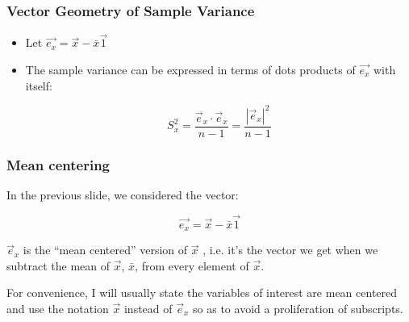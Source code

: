 \documentclass{beamer}
\begin{document}
\begin{frame}[shrink]
  \frametitle{Vector Geometry of Sample Variance}

\begin{itemize}

\item Let $\vec{e_x} = \vec{x} - \bar{x}\vec{1}$

\item The sample variance can be expressed in terms of dots products of $\vec{e_x}$ with itself:

\begin{equation*}
    S_{x}^2 = \frac{\vec{e}_x \cdot \vec{e}_x}{n-1} = \frac{|\vec{e}_x|^2}{n-1}
\end{equation*}


\end{itemize}

\medskip

\begin{center}
\end{center}

\end{frame}

\begin{frame}
  \frametitle{Mean centering}

In the previous slide, we considered the vector: 

\[
\vec{e_x} = \vec{x} - \bar{x}\vec{1}
\]

\smallskip

$\vec{e}_x$ is the ``mean centered'' version of $\vec{x}$ , i.e. it's the vector we get when we subtract the mean of $\vec{x}$, $\bar{x}$, from every element of $\vec{x}$.

\medskip

For convenience, I will usually state the variables of interest are mean centered and use the notation $\vec{x}$ instead of $\vec{e}_x$ so as to avoid a proliferation of subscripts.


\end{frame}
\end{document}
